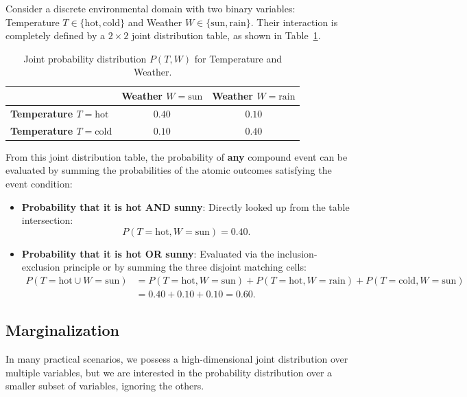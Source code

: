 Consider a discrete environmental domain with two binary variables: Temperature $T \in \{\text{hot}, \text{cold}\}$ and Weather $W \in \{\text{sun}, \text{rain}\}$. Their interaction is completely defined by a $2 \times 2$ joint distribution table, as shown in Table~\ref{tab:cs188_joint_simple}.

\begin{table}[htbp]
\centering
\caption{Joint probability distribution $P(T, W)$ for Temperature and Weather.}
\label{tab:cs188_joint_simple}
\begin{tabular}{lcc}
\toprule
& \textbf{Weather $W = \text{sun}$} & \textbf{Weather $W = \text{rain}$} \\
\midrule
\textbf{Temperature $T = \text{hot}$} & $0.40$ & $0.10$ \\
\textbf{Temperature $T = \text{cold}$} & $0.10$ & $0.40$ \\
\bottomrule
\end{tabular}
\end{table}

From this joint distribution table, the probability of \textbf{any} compound event can be evaluated by summing the probabilities of the atomic outcomes satisfying the event condition:
\begin{itemize}[noitemsep]
  \item \textbf{Probability that it is hot AND sunny}: Directly looked up from the table intersection:
  \begin{equation}
  P(T = \text{hot}, W = \text{sun}) = 0.40.
  \end{equation}
  \item \textbf{Probability that it is hot OR sunny}: Evaluated via the inclusion-exclusion principle or by summing the three disjoint matching cells:
  \begin{align}
  P(T = \text{hot} \cup W = \text{sun}) &= P(T=\text{hot}, W=\text{sun}) + P(T=\text{hot}, W=\text{rain}) + P(T=\text{cold}, W=\text{sun}) \nonumber \\
  &= 0.40 + 0.10 + 0.10 = 0.60.
  \end{align}
\end{itemize}

\subsection{Marginalization}
\label{sec:marginal_distributions}

In many practical scenarios, we possess a high-dimensional joint distribution over multiple variables, but we are interested in the probability distribution over a smaller subset of variables, ignoring the others. 

